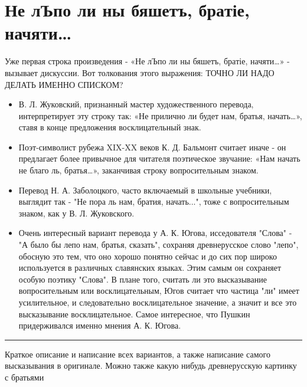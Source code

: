 \documentclass[14pt, a4paper]{article}
\newcommand{\descr}[1]
  {\par\noindent\rule{0.5\textwidth}{0.4pt} \par {\large #1}}
\begin{document}
{\section{Не лЪпо ли ны бяшетъ, бра­тіе, начяти…}
\par Уже первая строка произведения - «Не лЪпо ли ны бяшетъ, бра­тіе, начяти…» - вызывает дискуссии. 
Вот толкования этого выражения:
ТОЧНО ЛИ НАДО ДЕЛАТЬ ИМЕННО СПИСКОМ?
\begin{itemize}
  \item В. Л. Жуковский, признанный мастер художественного перевода, интерпретирует эту строку так: «Не прилично ли будет нам, братья, начать…», ставя в конце предложения восклицательный знак. 
  \item Поэт-символист рубежа XIX-XX веков К. Д. Бальмонт считает иначе - он предлагает более привычное для читателя поэтическое звучание: «Нам начать не благо ль, братья…», заканчивая строку вопросительным знаком.
  \item Перевод Н. А. Заболоцкого, часто включаемый в школьные учебники, выглядит так - "Не пора ль нам, братия, начать...", тоже с вопросительным знаком, как у В. Л. Жуковского.
  \item Очень интересный вариант перевода у А. К. Югова, исседователя "Слова" - "А было бы лепо нам, братья, сказать", сохраняя древнерусское слово "лепо", обосную это тем, что оно хорошо понятно сейчас и до сих пор широко используется в различных славянских языках. Этим самым он сохраняет особую поэтику "Слова". В плане того, считать ли это высказывание вопросительным или восклицательным, Югов считает что частица "ли" имеет усилительное, и следовательно восклицательное значение, а значит и все это высказывание восклицательное. Самое интересное, что Пушкин придерживался именно мнения А. К. Югова.
\end{itemize}
\descr{
Краткое описание и написание всех вариантов, а также написание самого высказывания в оригинале. Можно также какую нибудь древнерусскую картинку с братьями}

}
\end{document}
